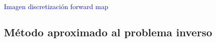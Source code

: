 









\textcolor{blue}{Imagen discretización forward map}



\subsection{Método aproximado al problema inverso}
